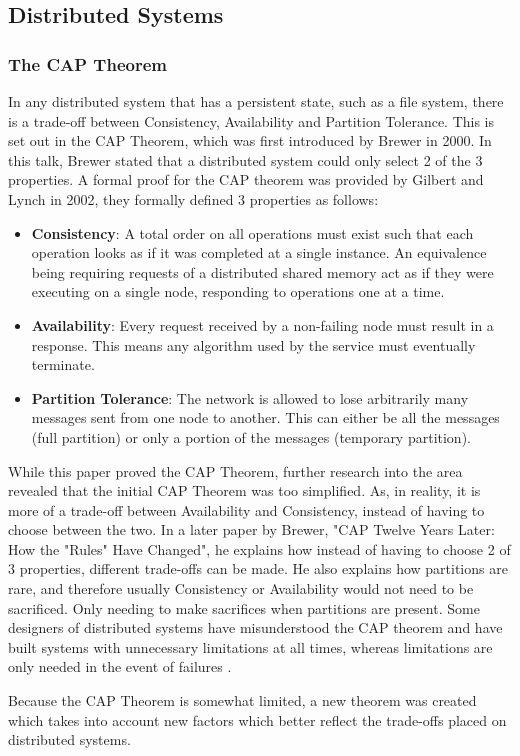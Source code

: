 \documentclass[12pt]{article}
\begin{document}
\subsection{Distributed Systems}
\subsubsection{The CAP Theorem}
In any distributed system that has a persistent state, such as a file system, there is a trade-off between Consistency, Availability and Partition Tolerance.
This is set out in the CAP Theorem, which was first introduced by Brewer in 2000\cite{CAPTheorem}. In this talk, Brewer stated that a distributed system could only select 2 of the 3 properties. A formal proof for the CAP theorem was provided by Gilbert and Lynch in 2002\cite{10.1145/564585.564601}, they formally defined 3 properties as follows:
\begin{itemize}
    \item \textbf{Consistency}: A total order on all operations must exist such that each operation looks as if it was completed at a single instance. An equivalence being requiring requests of a distributed shared memory act as if they were executing on a single node, responding to operations one at a time.
    \item \textbf{Availability}: Every request received by a non-failing node must result in a response.  This means any algorithm used by the service must eventually terminate.
    \item \textbf{Partition Tolerance}: The network is allowed to lose arbitrarily many messages sent from one node to another. This can either be all the messages (full partition) or only a portion of the messages (temporary partition).
\end{itemize}
While this paper proved the CAP Theorem, further research into the area revealed that the initial CAP Theorem was too simplified. As, in reality, it is more of a trade-off between Availability and Consistency, instead of having to choose between the two. In a later paper by Brewer, "CAP Twelve Years Later: How the "Rules" Have Changed"\cite{6133253}, he explains how instead of having to choose 2 of 3 properties, different trade-offs can be made. He also explains how partitions are rare, and therefore usually Consistency or Availability would not need to be sacrificed. Only needing to make sacrifices when partitions are present. Some designers of distributed systems have misunderstood the CAP theorem and have built systems with unnecessary limitations at all times, whereas limitations are only needed in the event of failures \cite{6133253}. \par
Because the CAP Theorem is somewhat limited, a new theorem was created which takes into account new factors which better reflect the trade-offs placed on distributed systems.
\end{document}
